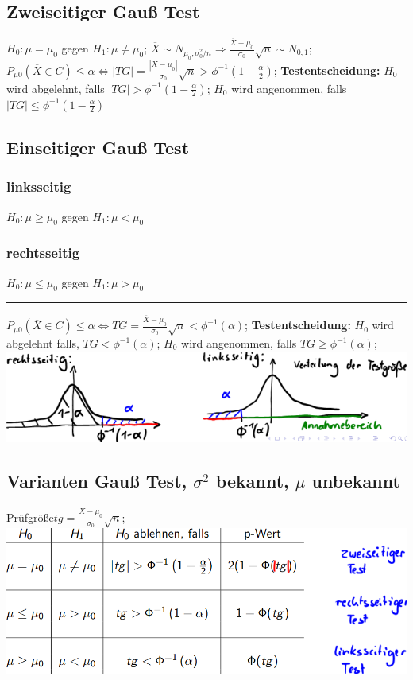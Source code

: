 \subsection{Zweiseitiger Gauß Test}
$ H_{0}: \mu = \mu_{0}  $ gegen $ H_{1}: \mu \neq \mu_{0} $; 
$ \overline{ X } \sim  N_{ \mu_{0}, \sigma_{0}^2 /n} \Rightarrow \frac{ \overline{X} - \mu_{0} }{ \sigma_{0} } \sqrt{n} \sim N_{0, 1} $; 
$ P_{ \mu0}( \overline{X} \in C ) \le \alpha \Leftrightarrow |TG| = \frac{ | \overline{X} - \mu_{0} | }{ \sigma_{0} } \sqrt{n} > \phi^{-1}(1-\frac{ \alpha}{2} )$; 
\textbf{Testentscheidung:} $ H_{0} $ wird abgelehnt, falls $ |TG| > \phi^{-1}(1-\frac{ \alpha }{ 2 } ) $; $ H_{0} $ wird angenommen, falls $ |TG| \le \phi^{-1}(1-\frac{ \alpha }{2} )$
\subsection{Einseitiger Gauß Test}
\subsubsection{linksseitig}
$ H_{0}: \mu \ge \mu_{0} $ gegen $ H_{1}: \mu  < \mu_{0}$
\subsubsection{rechtsseitig}
$ H_{0}: \mu \le \mu_{0} $ gegen $ H_{1}: \mu > \mu_{0} $
\hrule
$ P_{\mu 0} ( \overline{X} \in C ) \le \alpha \Leftrightarrow TG = \frac{ \overline{ X } - \mu_{0} }{ \sigma_{0} } \sqrt{n} < \phi^{-1} ( \alpha ) $; 
\textbf{Testentscheidung:} $ H_{0} $ wird abgelehnt falls, $ TG < \phi^{-1} ( \alpha )$; 
$ H_{0} $ wird angenommen, falls $ TG \ge \phi^{-1} ( \alpha ) $; 
\includegraphics[scale=0.25]{./pic/EinseitigerGausTest.png}
\subsection{Varianten Gauß Test, $ \sigma^2 $ bekannt, $\mu$ unbekannt}
Prüfgröße$ tg = \frac{ \overline{X} - \mu_{0} }{ \sigma_{0} }\sqrt{n} $; \\
\includegraphics[scale=0.25]{./pic/GausTests.png}
